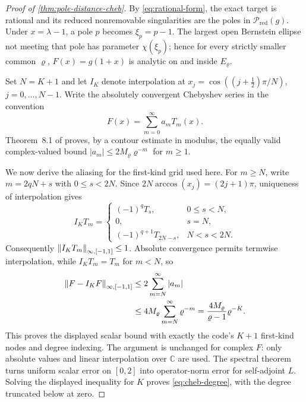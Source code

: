 \begin{proof}[Proof of \cref{thm:pole-distance-cheb}]
By \cref{eq:rational-form}, the exact target is rational and its
reduced nonremovable singularities are the poles in
$\mathcal P_{\mathrm{red}}(g)$.  Under $x=\lambda-1$, a pole $p$ becomes
$\xi_p=p-1$.  The largest open Bernstein ellipse not meeting that pole has
parameter $\chi(\xi_p)$; hence for every strictly smaller common $\varrho$,
$F(x)=g(1+x)$ is analytic on and inside $E_\varrho$.

Set $N=K+1$ and let $I_K$ denote interpolation at
$x_j=\cos((j+\tfrac12)\pi/N)$, $j=0,\ldots,N-1$.  Write the absolutely
convergent Chebyshev series in the convention
\begin{equation}
 F(x)=\sum_{m=0}^{\infty}a_mT_m(x).
\end{equation}
Theorem~8.1 of \citet{trefethen2019analytic} proves, by a contour estimate
in modulus, the equally valid complex-valued bound
$|a_m|\leq 2M_\varrho\varrho^{-m}$ for $m\geq1$.

We now derive the aliasing for the first-kind grid used here.  For $m\geq N$,
write $m=2qN+s$ with $0\leq s<2N$.  Since
$2N\arccos(x_j)=(2j+1)\pi$, uniqueness of interpolation gives
\begin{equation}
 I_KT_m=
 \begin{cases}
   (-1)^qT_s, & 0\leq s<N,\\
   0, & s=N,\\
   (-1)^{q+1}T_{2N-s}, & N<s<2N.
 \end{cases}
 \label{eq:first-kind-alias}
\end{equation}
Consequently $\left\lVert I_KT_m\right\rVert_{\infty,[-1,1]}\leq1$.  Absolute convergence
permits termwise interpolation, while $I_KT_m=T_m$ for $m<N$, so
\begin{align}
 \left\lVert F-I_KF\right\rVert_{\infty,[-1,1]}
 &\leq 2\sum_{m=N}^{\infty}|a_m| \\
 &\leq 4M_\varrho\sum_{m=N}^{\infty}\varrho^{-m}
  =\frac{4M_\varrho}{\varrho-1}\varrho^{-K}.
 \label{eq:first-kind-interpolation-bound}
\end{align}
This proves the displayed scalar bound with exactly the code's $K+1$
first-kind nodes and degree indexing.  The argument is unchanged for complex
$F$: only absolute values and linear interpolation over $\mathbb C$ are used.
The spectral theorem turns uniform scalar error on $[0,2]$ into operator-norm
error for self-adjoint $L$.  Solving the displayed inequality for $K$ proves
\cref{eq:cheb-degree}, with the degree truncated below at zero.
\end{proof}

